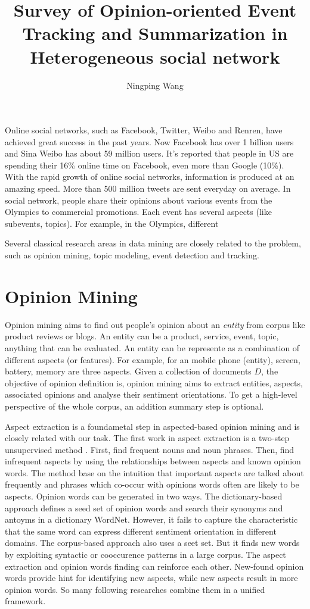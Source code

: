 \documentclass{article}
\title{Survey of Opinion-oriented Event Tracking and Summarization in Heterogeneous social network}
\author{Ningping Wang}
\begin{document}
\maketitle

Online social networks, such as Facebook, Twitter, Weibo and Renren, have achieved great success in the past years. Now Facebook has over 1 billion users and Sina Weibo has about 59 million users. It's reported that people in US are spending their 16\% online time on Facebook, even more than Google (10\%). With the rapid growth of online social networks, information is produced at an amazing speed. More than 500 million tweets are sent everyday on average. In social network, people share their opinions about various events from the Olympics to commercial promotions. Each event has several aspects (like subevents, topics). For example, in the Olympics, different

Several classical research areas in data mining are closely related to the problem, such as opinion mining, topic modeling, event detection and tracking. 

\section {Opinion Mining}
Opinion mining aims to find out people's opinion about an {\em entity} from corpus like product reviews or blogs. An entity can be a product, service, event, topic, anything that can be evaluated. An entity can be represente as a combination of different aspects (or features). For example, for an mobile phone (entity), screen, battery, memory are three aspects. Given a collection of documents $D$, the objective of opinion definition is, opinion mining aims to extract entities, aspects, associated opinions and analyse their sentiment orientations. To get a high-level perspective of the whole corpus, an addition summary step is optional.

Aspect extraction is a foundametal step in aspected-based opinion mining and is closely related with our task. The first work in aspect extraction is a two-step unsupervised method \cite{hu2004mining}. First, find frequent nouns and noun phrases. Then, find infrequent aspects by using the relationships between aspects and known opinion words. The method base on the intuition that important aspects are talked about frequently and phrases which co-occur with opinions words often are likely to be aspects. Opinion words can be generated in two ways. The dictionary-based approach defines a seed set of opinion words and search their synonyms and antoyms in a dictionary WordNet. However, it fails to capture the characteristic that the same word can express different sentiment orientation in different domains. The corpus-based approach also uses a seet set. But it finds new words by exploiting syntactic or cooccurence patterns in a large corpus\cite{hatzivassiloglou1997predicting}. The aspect extraction and opinion words finding can reinforce each other. New-found opinion words provide hint for identifying new aspects, while new aspects result in more opinion words. So many following researches combine them in a unified framework. 
\end{document}

